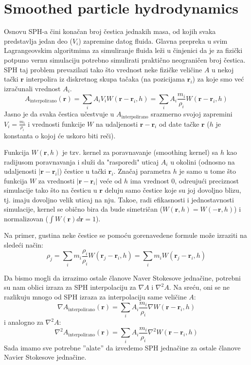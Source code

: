 \documentclass[12pt]{article}
\renewcommand{\vec}[1]{\mathbf{#1}}
\begin{document}
\section{Smoothed particle hydrodynamics}
    Osnovu SPH-a \v cini kona\v can broj \v cestica jednakih masa, od kojih svaka predstavlja jedan deo ($V_i$) zapremine datog fluida.
    Glavna prepreka u svim Lagrangeovskim algoritmima za simuliranje fluida le\v zi u \v cinjenici da je za fizi\v cki potpuno vernu simulaciju potrebno simulirati prakti\v cno neograni\v cen broj \v cestica. SPH taj problem prevazilazi tako \v sto vrednost neke fizi\v cke veli\v cine $A$ u nekoj ta\v cki $\vec{r}$ interpolira iz diskretnog skupa ta\v caka (na pozicijama $\vec{r}_i$) za koje smo ve\'c izra\v cunali vrednost $A_i$.
        $$A_\text{interpolirano}(\vec{r}) = \sum_i{A_i V_i W(\vec{r}-\vec{r}_i, h)} = \sum_i{A_i \frac{m_i}{\rho_i} W(\vec{r}-\vec{r}_i, h)}$$
    Jasno je da svaka \v cestica u\v cestvuje u $A_\text{interpolirano}$ srazmerno svojoj zapremini $V_i=\frac{m_i}{\rho_i}$ i vrednosti funkcije $W$ na udaljenosti $\vec{r}-\vec{r}_i$ od date ta\v cke $\vec{r}$ ($h$ je konstanta o kojoj \'ce uskoro biti re\v ci).

    Funkcija $W(\vec{r}, h)$ je tzv. kernel za poravnavanje (smoothing kernel) sa $h$ kao radijusom poravnavanja i slu\v zi da "rasporedi" uticaj $A_i$ u okolini (odnosno na udaljenosti $|\vec{r}-\vec{r}_i|$) \v cestice u ta\v cki $\vec{r}_i$. Zna\v caj parametra $h$ je samo u tome \v sto funkcija $W$ za vrednosti $|\vec{r}-\vec{r}_i|$ ve\'ce od $h$ ima vrednost 0, odre\dj uju\'ci preciznost simulacije tako \v sto na \v cesticu u $\vec{r}$ deluju samo \v cestice koje su joj dovoljno blizu, tj. imaju dovoljno velik uticaj na nju. Tako\dj e, radi efikasnosti i jednostavnosti simulacije, kernel se obi\v cno bira da bude simetri\v can ($W(\vec{r}, h)=W(-\vec{r}, h)$) i normalizovan ($\int W(\vec{r})d\vec{r}=1$).

    Na primer, gustina neke \v cestice se pomo\'cu gorenavedene formule mo\v ze izraziti na slede\'ci na\v cin:
    $$\rho_j=\sum_i{m_i \frac{\rho_i}{\rho_i} W(\vec{r}_j-\vec{r}_i, h)}=\sum_i{m_i W(\vec{r}_j-\vec{r}_i, h)}$$

    Da bismo mogli da izrazimo ostale \v clanove Naver Stokesove jedna\v cine, potrebni su nam oblici izraza za SPH interpolaciju za $\nabla A$ i $\nabla^2 A$. Na sre\'cu, oni se ne razlikuju mnogo od SPH izraza za interpolaciju same veli\v cine $A$:
    $$\nabla A_\text{interpolirano}(\vec{r}) = \sum_i{A_i \frac{m_i}{\rho_i} \nabla W(\vec{r}-\vec{r}_i, h)}$$
    i analogno za $\nabla^2 A$:
    $$\nabla^2 A_\text{interpolirano}(\vec{r}) = \sum_i{A_i \frac{m_i}{\rho_i} \nabla^2 W(\vec{r}-\vec{r}_i, h)}$$
    Sada imamo sve potrebne ''alate'' da izvedemo SPH jedna\v cine za ostale \v clanove Navier Stokesove jedna\v cine.
\end{document}
